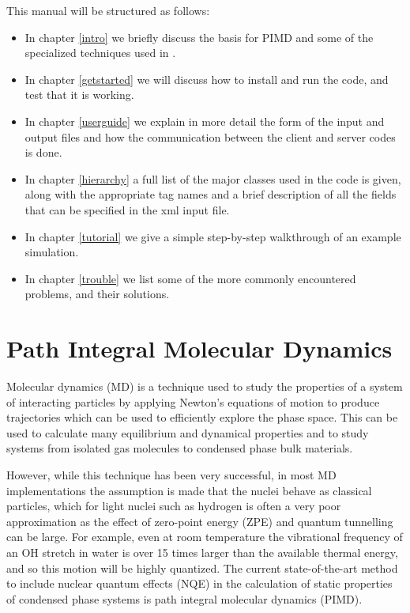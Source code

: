 \documentclass[11pt,english,fleqn]{report}
\begin{document}
This manual will be structured as follows: 
\begin{itemize}
\item In chapter \ref{intro} we briefly discuss the basis for PIMD and
some of the specialized techniques used in \ipi. 
\item In chapter \ref{getstarted} we will discuss how to install 
and run the code, and test that it is working.
\item In chapter \ref{userguide} we explain in more detail the form of the input
and output files and how the communication between the client and
server codes is done.
\item In chapter \ref{hierarchy} a full list of the major classes used
in the code is given, along with the appropriate tag names and a brief
description of all the fields that can be specified in the xml input
file.
\item In chapter \ref{tutorial} we give a simple step-by-step walkthrough of
an example \ipi simulation.
\item In chapter \ref{trouble} we list some of the more commonly encountered
problems, and their solutions.
\end{itemize}

\section{Path Integral Molecular Dynamics}

Molecular dynamics (MD) is a technique used to study the properties
of a system of interacting particles by applying Newton's equations
of motion to produce trajectories which can be used to efficiently
explore the phase space. This can be used to calculate many equilibrium
and dynamical properties and to study systems from isolated gas molecules
to condensed phase bulk materials.

However, while this technique has been very successful, in most MD
implementations the assumption is made that the nuclei behave as classical
particles, which for light nuclei such as hydrogen is often a very
poor approximation as the effect of zero-point energy (ZPE) and quantum
tunnelling can be large. For example, even at room temperature the
vibrational frequency of an OH stretch in water is over 15 times larger
than the available thermal energy, and so this motion will be highly
quantized. The current state-of-the-art method to include nuclear
quantum effects (NQE) in the calculation of static properties of condensed
phase systems is path integral molecular dynamics (PIMD).
\end{document}
